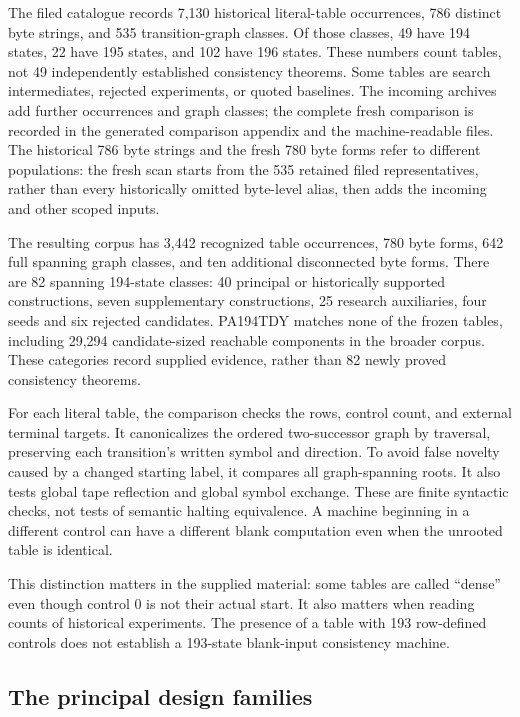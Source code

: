 \documentclass[11pt]{article}
\begin{document}
The filed catalogue records 7,130 historical literal-table occurrences,
786 distinct byte strings, and 535 transition-graph classes. Of those classes,
49 have 194 states, 22 have 195 states, and 102 have 196 states. These numbers
count tables, not 49 independently established consistency theorems. Some
tables are search intermediates, rejected experiments, or quoted baselines.
The incoming archives add further occurrences and graph classes; the complete
fresh comparison is recorded in the generated comparison appendix and the
machine-readable files. The historical 786 byte strings and the fresh 780
byte forms refer to different populations: the fresh scan starts from the
535 retained filed representatives, rather than every historically omitted
byte-level alias, then adds the incoming and other scoped inputs.

The resulting corpus has 3,442 recognized table occurrences, 780 byte forms,
642 full spanning graph classes, and ten additional disconnected byte forms.
There are 82 spanning 194-state classes: 40 principal or historically supported
constructions, seven supplementary constructions, 25 research auxiliaries,
four seeds and six rejected candidates. PA194TDY matches none of the frozen
tables, including 29,294 candidate-sized reachable components in the broader
corpus. These categories record supplied evidence, rather than 82 newly
proved consistency theorems.

For each literal table, the comparison checks the rows, control count, and
external terminal targets. It canonicalizes the ordered two-successor graph by
traversal, preserving each transition's written symbol and direction. To
avoid false novelty caused by a changed starting label, it compares all
graph-spanning roots. It also tests global tape reflection and global symbol
exchange. These are finite syntactic checks, not tests of semantic halting
equivalence. A machine beginning in a different control can have a different
blank computation even when the unrooted table is identical.

This distinction matters in the supplied material: some tables are called
``dense'' even though control $0$ is not their actual start. It also matters
when reading counts of historical experiments. The presence of a table with
193 row-defined controls does not establish a 193-state blank-input
consistency machine.

\subsection{The principal design families}
\end{document}
